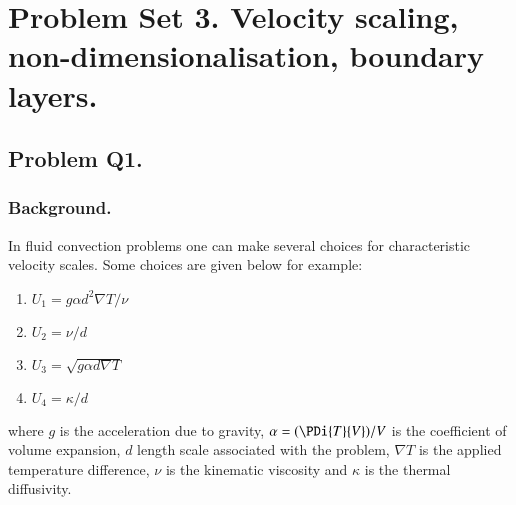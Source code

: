 %
%
%
%
%

\chapter{Problem Set 3.  Velocity scaling, non-dimensionalisation, boundary layers.}
\label{chap:continuumProblemSet3}
\date{Mar 23, 2012}

\beginArtNoToc
%

\section{Problem Q1.}
\subsection{Background.}

In fluid convection problems one can make several choices for characteristic velocity scales.  Some choices are given below for example:

\begin{enumerate}
\item $U_1 = g \alpha d^2 \nabla T/\nu$
\item $U_2 = \nu/d$
\item $U_3 = \sqrt{ g \alpha d \nabla T }$
\item $U_4 = \kappa/ d$
\end{enumerate}

where $g$ is the acceleration due to gravity, $\alpha = (\PDi{T}{V})/V$ is the coefficient of volume expansion, $d$ length scale associated with the problem, $\nabla T$ is the applied temperature difference, $\nu$ is the kinematic viscosity and $\kappa$ is the thermal diffusivity.  

